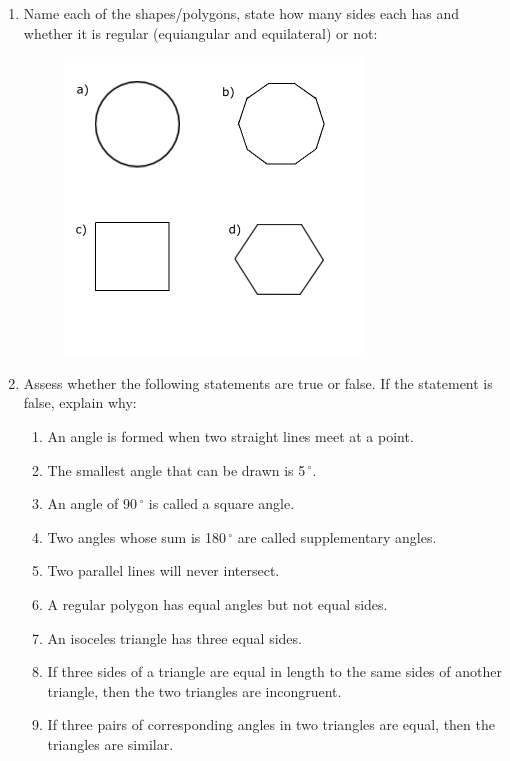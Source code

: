 \begin{enumerate}[noitemsep, label=\textbf{\arabic*}. ]
\begin{figure}[H]
\begin{center}
    \end{center}
 \end{figure}       
\label{m39368*uid141}\item Name each of the shapes/polygons, state how many sides each has and whether it is regular (equiangular and equilateral) or not:
    \setcounter{subfigure}{0}
	\begin{figure}[H] %
    \begin{center}
    \label{m39368*id401233!!!underscore!!!media}\label{m39368*id401233!!!underscore!!!printimage}\includegraphics[width=300px]{col11306.imgs/m39368_MG10C13_068.png} %
      \vspace{2pt}
    \vspace{.1in}
    \end{center}
 \end{figure}       
\label{m39368*uid142}\item Assess whether the following statements are true or false. If the statement is false, explain why:
\label{m39368*id401234}\begin{enumerate}[noitemsep, label=\textbf{\alph*}. ] 
            \item An angle is formed when two straight lines meet at a point.	\item The smallest angle that can be drawn is 5\ensuremath{{\,}^{\circ}}.\item An angle of 90\ensuremath{{\,}^{\circ}} is called a square angle.\item Two angles whose sum is 180\ensuremath{{\,}^{\circ}} are called supplementary angles.\item Two parallel lines will never intersect.\item A regular polygon has equal angles but not equal sides.\item An isoceles triangle has three equal sides.\item If three sides of a triangle are equal in length to the same sides of another triangle, then the two triangles are incongruent.\item If three pairs of corresponding angles in two triangles are equal, then the triangles are similar.\end{enumerate}

\end{enumerate}

